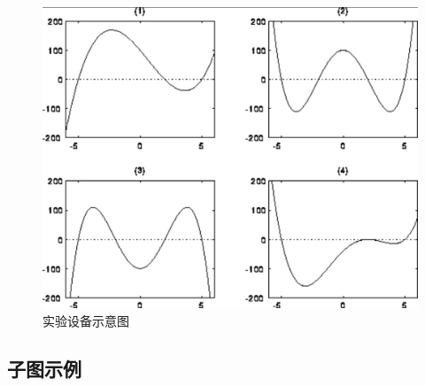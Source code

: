 \documentclass[a4paper]{article}
\begin{document}
\begin{figure}[H]
    \centering
    \includegraphics[width=0.7\linewidth]{images/plot.png}
    \caption{实验设备示意图}
    \label{fig:equipment_diagram}
\end{figure}

\subsection{子图示例}
\end{document}
